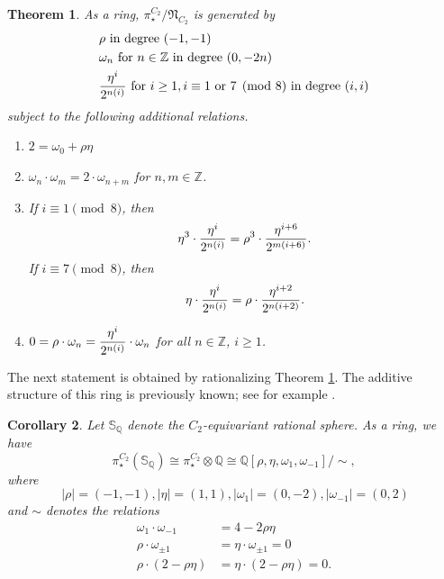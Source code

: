 \documentclass[psamsfonts]{amsart}
\newcommand{\Q}{\mathbb Q}
\newcommand{\Z}{\mathbb Z}
\newcommand{\fN}{\mathfrak N}
\newtheorem{theorem}{Theorem}[section]
\newtheorem{corollary}[theorem]{Corollary}
\theoremstyle{definition}
\theoremstyle{remark}
\numberwithin{equation}{section}
\begin{document}
\begin{theorem}\label{thm:main-ring}
As a ring, $\pi_\star^{C_2}/\fN_{C_2}$ is generated by
\begin{align*}
 & \rho \text{ in degree $(-1,-1)$}
\\ & \omega_n \text{ for } n \in \Z \text{ in degree $(0, -2n)$}
\\ & {\eta^i\over 2^{n(i)}} \text{ for } i \geq 1, i\equiv 1\text{ or } 7\pmod 8 \text{ in degree $(i,i)$}
\end{align*}
subject to the following additional relations.
\begin{enumerate}
	\item $2 = \omega_0 + \rho\eta$
    \item $\omega_n\cdot \omega_m = 2\cdot \omega_{n+m}$ for $n, m \in \Z$.
    \item 
    If $i\equiv 1\pmod 8$, then
	$$ \eta^3 \cdot {\eta^i\over 2^{n(i)}} = \rho^3 \cdot {\eta^{i+6}\over 2^{m(i+6)}}. $$
	If $i\equiv 7\pmod 8$, then
	$$ \eta\cdot {\eta^i\over 2^{n(i)}} = \rho \cdot {\eta^{i+2}\over 2^{n(i+2)}}. $$
    \item $\displaystyle 0 = \rho \cdot \omega_n = {\eta^i\over 2^{n(i)}}\cdot \omega_n$ for all $n\in \Z$, $i\geq 1$.
\end{enumerate}
\end{theorem}

The next statement is obtained by rationalizing Theorem \ref{thm:main-ring}. The
additive structure of this ring is previously known; see for example \cite{GQ}.

\begin{corollary}\label{cor:rationalization}
Let $\mathbb{S}_{\mathbb{Q}}$ denote the $C_2$-equivariant rational sphere.
As a ring, we have
$$ \pi_\star^{C_2}(\mathbb{S}_\mathbb{Q}) \cong \pi_\star^{C_2}\otimes \Q \cong \Q[\rho, \eta, \omega_1, \omega_{-1}]\big/ \sim, $$ where $$\ |\rho|=(-1, -1), |\eta|=(1, 1), |\omega_1|=(0, -2), |\omega_{-1}|=(0, 2) $$
and $\sim$ denotes the relations
\begin{align*}
\omega_1\cdot \omega_{-1}  & = 4-2\rho\eta 
\\\rho\cdot \omega_{\pm 1}  &= \eta\cdot \omega_{\pm 1} = 0
\\ \rho\cdot (2-\rho\eta) & =\eta\cdot (2-\rho\eta)=0.
\end{align*}
\end{corollary}
\end{document}
